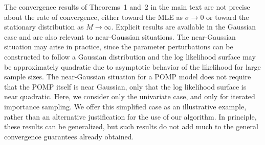 \documentclass[11pt]{article}
\begin{document}
The convergence results of Theorems~1 and~2 in the main text are not precise about the rate of convergence, either toward the MLE as $\sigma\to 0$ or toward the stationary distribution as $M\to\infty$. 
Explicit results are available in the Gaussian case and are also relevant to near-Gaussian situations.
The near-Gaussian situation may arise in practice, since the parameter perturbations can be constructed to follow a Gaussian distribution and the log likelihood surface may be approximately quadratic due to asymptotic behavior of the likelihood for large sample sizes.
The near-Gaussian situation for a POMP model does not require that the POMP itself is near Gaussian, only that the log likelihood surface is near quadratic.
Here, we consider only the univariate case, and only for iterated importance sampling. 
We offer this simplified case as an illustrative example, rather than an alternative justification for the use of our algorithm.
In principle, these results can be generalized, but such results do not add much to the general convergence guarantees already obtained.
\end{document}
